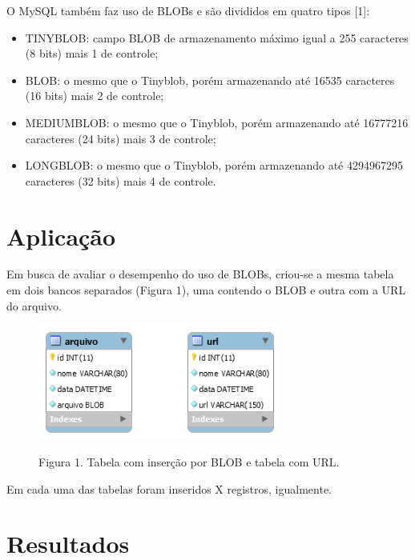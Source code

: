 \documentclass[12pt,a4paper]{article}
\begin{document}
O MySQL também faz uso de BLOBs e são divididos em quatro tipos [1]:
\begin{itemize}
	\item TINYBLOB: campo BLOB de armazenamento máximo igual a 255 caracteres (8 bits) mais 1 de controle;
	\item BLOB: o mesmo que o Tinyblob, porém armazenando até 16535 caracteres (16 bits) mais 2 de controle;
	\item MEDIUMBLOB: o mesmo que o Tinyblob, porém armazenando até 16777216 caracteres (24 bits) mais 3 de controle;
	\item LONGBLOB: o mesmo que o Tinyblob, porém armazenando até 4294967295 caracteres (32 bits) mais 4 de controle.
\end{itemize}

\section{Aplicação}
Em busca de avaliar o desempenho do uso de BLOBs, criou-se a mesma tabela em dois bancos separados (Figura 1), uma contendo o BLOB e outra com a URL do arquivo.

\begin{figure}[htb]
	\label{figura:tabelas}
	\centering
	\includegraphics[width=8cm]{recursos/imagens/tabelas.png} 
	
	Figura 1. Tabela com inserção por BLOB e tabela com URL.
\end{figure}

Em cada uma das tabelas foram inseridos X registros, igualmente. 



\section{Resultados}




\end{document}
